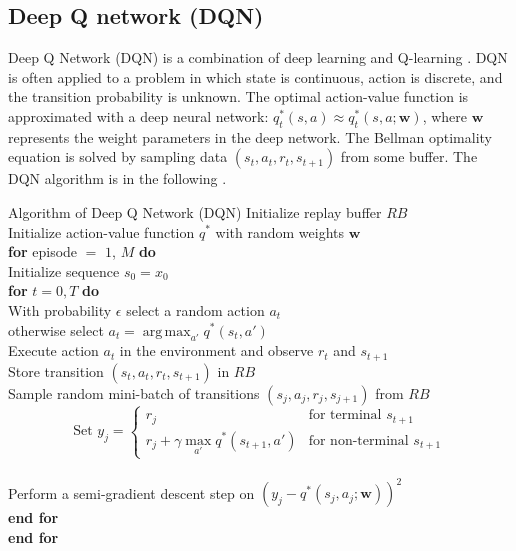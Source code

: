 \documentclass[11pt]{article}
\DeclareMathOperator*{\argmax}{arg\,max}
\begin{document}
\subsection{Deep Q network (DQN)}

Deep Q Network (DQN) \citep{Mnih:etal:2013} is a combination of deep learning \citep{Goodfellow:etal:2018} and Q-learning \citep{Watkins:Dayan:1992}. DQN is often applied to a problem in which state is continuous, action is discrete, and the transition probability is unknown. The optimal action-value function is approximated with a deep neural network: $q^\ast_t(s,a) \approx q^\ast_t(s,a; \bm{w})$, where $\bm{w}$ represents the weight parameters in the deep network. The Bellman optimality equation is solved by sampling data $(s_t, a_t, r_t, s_{t+1})$ from some buffer. The DQN algorithm is in the following \citep{Mnih:etal:2013}.

\vspace{1zw}

\begin{itembox}[l]{Algorithm of Deep Q Network (DQN) \citep{Mnih:etal:2013}}
	Initialize replay buffer $RB$ \\
	Initialize action-value function $q^\ast$ with random weights $\bm{w}$ \\
	\textbf{for} episode $=$ $1$, $M$ \textbf{do} \\
	\hspace{2zw} Initialize sequence $s_0 = x_0$ \\
	\hspace{2zw} \textbf{for} $t = 0, T$ \textbf{do} \\
		\hspace{4zw} With probability $\epsilon$ select a random action $a_t$ \\
		\hspace{4zw} otherwise select $a_t = \argmax_{a'} q^{\ast}(s_t, a')$ \\
		\hspace{4zw} Execute action $a_t$ in the environment and observe $r_t$ and $s_{t+1}$ \\
		\hspace{4zw} Store transition $(s_t, a_t, r_t, s_{t+1})$ in $RB$ \\
		\hspace{4zw} Sample random mini-batch of transitions $(s_j, a_j, r_j, s_{j+1})$ from $RB$ \\
		\begin{equation}
		\text{Set } y_j = \begin{cases}
				r_j & \text{for terminal $s_{t+1}$} \\
				r_j + \gamma \max_{a'} q^{\ast} (s_{t+1}, a') & \text{for non-terminal $s_{t+1}$}
			\end{cases}
		\end{equation} \\
		\hspace{4zw} Perform a semi-gradient descent step on $(y_j - q^\ast(s_j, a_j; \bm{w}))^2$ \\
	\hspace{2zw} \textbf{end for} \\
	\textbf{end for}
\end{itembox}
\end{document}
